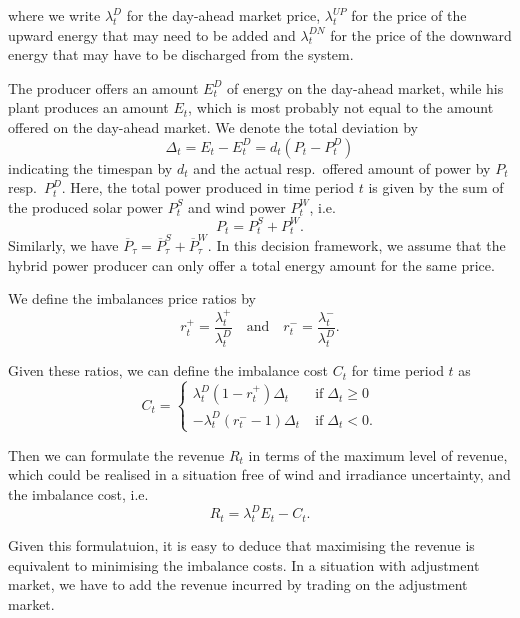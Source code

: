 where we write $\lambda_{t}^{D}$ for the day-ahead market price, $\lambda_{t}^{UP}$ for the price of the upward energy that may need to be added and $\lambda_{t}^{DN}$ for the price of the downward energy that may have to be discharged from the system.

The producer offers an amount $E_{t}^{D}$ of energy on the day-ahead market, while his plant produces an amount $E_{t}$, which is most probably not equal to the amount offered on the day-ahead market. We denote the total deviation by 
\begin{equation*}
\Delta_{t}=E_{t}-E_{t}^{D}=d_{t}\left(P_{t}-P_{t}^{D}\right)
\end{equation*}
indicating the timespan by $d_{t}$ and the actual resp.\ offered amount of power by $P_{t}$ resp.\ $P_{t}^{D}$.
Here, the total power produced in time period $t$ is given by the sum of the produced solar power $P_t^S$ and wind power $P_t^W$, i.e. 
$$ P_t = P_t^S + P_t^W.$$ Similarly, we have $\overline{P}_\tau = \overline{P}^S_\tau+ \overline{P}^W_\tau$. In this decision framework, we assume that the hybrid power producer can only offer a total energy amount for the same price. 


We define the imbalances price ratios by  
\begin{equation*}
r_{t}^{+}= \frac{\lambda_{t}^{+}}{\lambda_{t}^{D}} \quad \mathrm{and} \quad r_{t}^{-}=\frac{\lambda_{t}^{-}}{\lambda_{t}^{D}}.
\end{equation*}

Given these ratios, we can define the imbalance cost $C_t$ for time period $t$ as
\begin{equation*}
C_{t}=\begin{cases}
\lambda_{t}^D\left(1-r_{t}^{+}\right)\Delta_{t} &\mathrm{\; if \;} \Delta_{t}\ge 0
\\ -\lambda_{t}^{D}\left(r_{t}^{-}-1\right)\Delta_{t} &\mathrm{\; if \;} \Delta_{t}<0.
\end{cases}
\end{equation*}

Then we can formulate the revenue $R_t$ in terms of the maximum level of revenue, which could be realised in a situation free of wind and irradiance uncertainty, and the imbalance cost, i.e. 
\begin{equation*}
R_{t}=\lambda_{t}^{D}E_{t}-C_{t}.
\end{equation*}

Given this formulatuion, it is easy to deduce that maximising the revenue is equivalent to minimising the imbalance costs. In a situation with adjustment market, we have to add the revenue incurred by trading on the adjustment market.

